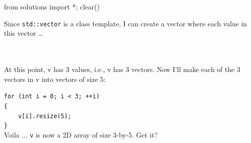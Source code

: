 \begin{python0}
from solutions import *; clear()
\end{python0}

Since \texttt{std::vector} is a class template, I can create a vector where each value in this vector \ldots {}

\\
\\

At this point, v has 3 values, i.e., v has 3 vectors. Now I'll make each
of the 3 vectors in v into vectors of size 5:

\verb!for (int i = 0; i < 3; ++i)!\\
\verb!{!\\            
\verb!    v[i].resize(5);!\\
\verb!}!\\

Voila ... \verb!v! is now a 2D array of size 3-by-5. Get it?

